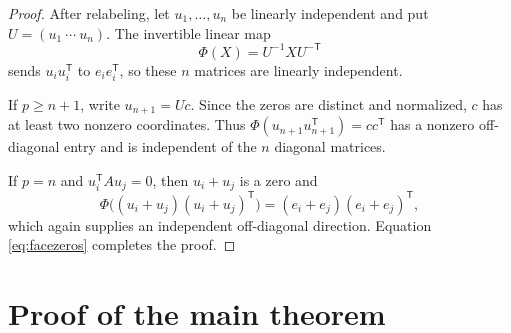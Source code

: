 \documentclass[11pt]{amsart}
\theoremstyle{remark}
\begin{document}
\begin{proof}
After relabeling, let $u_1,\dots,u_n$ be linearly independent and put
$U=(u_1\ \cdots\ u_n)$. The invertible linear map
\[
\Phi(X)=U^{-1}XU^{-\mathsf T}
\]
sends $u_i u_i^{\mathsf T}$ to $e_i e_i^{\mathsf T}$, so these $n$
matrices are linearly independent.

If $p\ge n+1$, write $u_{n+1}=Uc$. Since the zeros are distinct and
normalized, $c$ has at least two nonzero coordinates. Thus
$\Phi(u_{n+1}u_{n+1}^{\mathsf T})=cc^{\mathsf T}$ has a nonzero
off-diagonal entry and is independent of the $n$ diagonal matrices.

If $p=n$ and $u_i^{\mathsf T}Au_j=0$, then $u_i+u_j$ is a zero and
\[
\Phi\bigl((u_i+u_j)(u_i+u_j)^{\mathsf T}\bigr)
=(e_i+e_j)(e_i+e_j)^{\mathsf T},
\]
which again supplies an independent off-diagonal direction. Equation
\eqref{eq:facezeros} completes the proof.
\end{proof}

\section{Proof of the main theorem}
\end{document}
